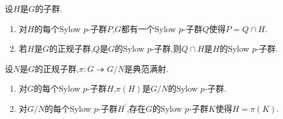\begin{corollary}{}{}
	设$H$是$G$的子群.
	\begin{enumerate}
		\item 对$H$的每个Sylow $p$-子群$P$,$G$都有一个Sylow $p$-子群$Q$使得$P=Q\cap H$.
		\item 若$H$是$G$的正规子群,$Q$是$G$的Sylow $p$-子群,则$Q\cap H$是$H$的Sylow $p$-子群.
	\end{enumerate}	
\end{corollary}

\begin{corollary}{}{}
	设$N$是$G$的正规子群,$\pi:G\twoheadrightarrow G/N$是典范满射.
	\begin{enumerate}
		\item 对$G$的每个Sylow $p$-子群$H$,$\pi\left(H\right)$是$G/N$的Sylow $p$-子群.
		\item 对$G/N$的每个Sylow $p$-子群$H^{\prime}$,存在$G$的Sylow $p$-子群$K$使得$H=\pi\left(K\right)$.
	\end{enumerate}
\end{corollary}


































































